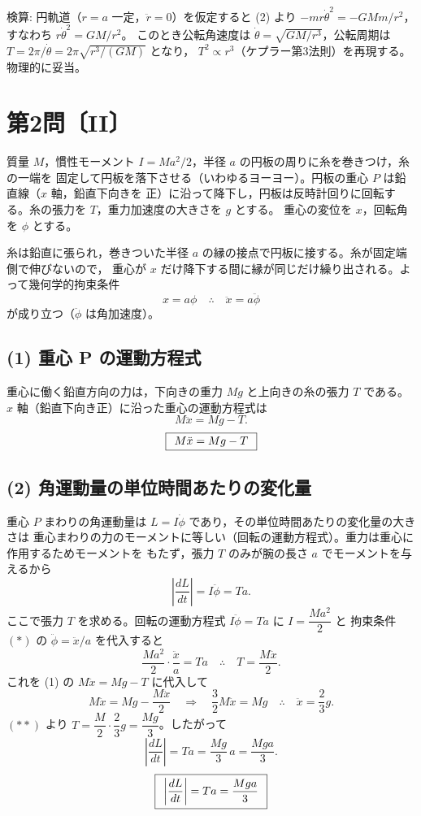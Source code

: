 \documentclass[11pt,a4paper]{article}
\begin{document}
\medskip
検算: 円軌道（$r=a$ 一定，$\ddot r=0$）を仮定すると (2) より
$-mr\dot\theta^2=-GMm/r^2$，すなわち $r\dot\theta^2=GM/r^2$。
このとき公転角速度は $\dot\theta=\sqrt{GM/r^3}$，公転周期は
$T=2\pi/\dot\theta=2\pi\sqrt{r^3/(GM)}$ となり，
$T^2\propto r^3$（ケプラー第3法則）を再現する。物理的に妥当。\checkmark

\clearpage
\section*{第2問〔II〕}

質量 $M$，慣性モーメント $I=Ma^2/2$，半径 $a$ の円板の周りに糸を巻きつけ，糸の一端を
固定して円板を落下させる（いわゆるヨーヨー）。円板の重心 $P$ は鉛直線（$x$ 軸，鉛直下向きを
正）に沿って降下し，円板は反時計回りに回転する。糸の張力を $T$，重力加速度の大きさを $g$ とする。
重心の変位を $x$，回転角を $\phi$ とする。

糸は鉛直に張られ，巻きついた半径 $a$ の縁の接点で円板に接する。糸が固定端側で伸びないので，
重心が $x$ だけ降下する間に縁が同じだけ繰り出される。よって幾何学的拘束条件
\[
  x=a\phi
  \quad\therefore\quad \ddot{x}=a\ddot{\phi}
  \tag{$\ast$}
\]
が成り立つ（$\ddot\phi$ は角加速度）。

\subsection*{(1) 重心 P の運動方程式}
重心に働く鉛直方向の力は，下向きの重力 $Mg$ と上向きの糸の張力 $T$ である。
$x$ 軸（鉛直下向き正）に沿った重心の運動方程式は
\[
  M\ddot{x}=Mg-T.
\]
\[
  \boxed{\,\;M\ddot{x}=Mg-T\;\,}
\]

\subsection*{(2) 角運動量の単位時間あたりの変化量}
重心 $P$ まわりの角運動量は $L=I\dot{\phi}$ であり，その単位時間あたりの変化量の大きさは
重心まわりの力のモーメントに等しい（回転の運動方程式）。重力は重心に作用するためモーメントを
もたず，張力 $T$ のみが腕の長さ $a$ でモーメントを与えるから
\[
  \left|\frac{dL}{dt}\right|=I\ddot{\phi}=T a.
\]
ここで張力 $T$ を求める。回転の運動方程式 $I\ddot\phi=Ta$ に $I=\dfrac{Ma^2}{2}$ と
拘束条件 $(\ast)$ の $\ddot\phi=\ddot x/a$ を代入すると
\[
  \frac{Ma^2}{2}\cdot\frac{\ddot{x}}{a}=Ta
  \quad\therefore\quad T=\frac{M\ddot{x}}{2}.
  \tag{$\ast\ast$}
\]
これを (1) の $M\ddot x=Mg-T$ に代入して
\[
  M\ddot{x}=Mg-\frac{M\ddot{x}}{2}
  \quad\Longrightarrow\quad \frac{3}{2}M\ddot{x}=Mg
  \quad\therefore\quad \ddot{x}=\frac{2}{3}g.
\]
$(\ast\ast)$ より $T=\dfrac{M}{2}\cdot\dfrac{2}{3}g=\dfrac{Mg}{3}$。したがって
\[
  \left|\frac{dL}{dt}\right|=Ta=\frac{Mg}{3}\,a=\frac{Mga}{3}.
\]
\[
  \boxed{\,\;\left|\dfrac{dL}{dt}\right|=Ta=\dfrac{Mga}{3}\;\,}
\]
\end{document}
